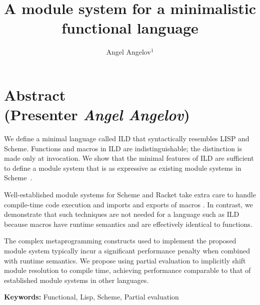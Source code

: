 \documentclass[12pt,a4paper]{amsart}
\title[ILD Module system]{\bf A module system for a minimalistic functional language}
\author[A. Angelov]{Angel Angelov$^1$}
\newcommand\lang{ILD }
\theoremstyle{definition}
\begin{document}
\maketitle

\thispagestyle{fancy}

\section*{Abstract\\{\small\normalfont (Presenter \textit{Angel Angelov})}}

\bigskip
We define a minimal language called \lang that syntactically resembles LISP and
Scheme. Functions and macros in \lang are indistinguishable; the distinction is
made only at invocation. We show that the minimal features of \lang are
sufficient to define a module system that is as expressive as existing module
systems in Scheme~\cite{r6rs}.

Well-established module systems for Scheme and Racket take extra care to handle
compile-time code execution and imports and exports of macros
\cite{module-system-for-scheme,submodules-in-racket}. In contrast, we
demonstrate that such techniques are not needed for a language such as \lang
because macros have runtime semantics and are effectively identical to
functions.

The complex metaprogramming constructs used to implement the proposed module
system typically incur a significant performance penalty when combined with
runtime semantics. We propose using partial evaluation to implicitly shift
module resolution to compile time, achieving performance comparable to that of
established module systems in other languages.
\bigskip

\noindent\textbf{Keywords:} %
Functional, Lisp, Scheme, Partial evaluation
\bigskip

\pagebreak
\thispagestyle{plain}
\printbibliography[title={References}]

\newpage\thispagestyle{empty}
\end{document}
